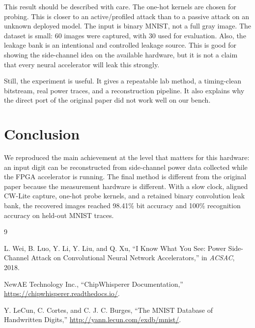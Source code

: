 \documentclass[10pt,conference]{IEEEtran}
\begin{document}
This result should be described with care. The one-hot kernels are chosen for
probing. This is closer to an active/profiled attack than to a passive attack on
an unknown deployed model. The input is binary MNIST, not a full gray image. The
dataset is small: 60 images were captured, with 30 used for evaluation. Also,
the leakage bank is an intentional and controlled leakage source. This is good
for showing the side-channel idea on the available hardware, but it is not a
claim that every neural accelerator will leak this strongly.

Still, the experiment is useful. It gives a repeatable lab method, a timing-clean
bitstream, real power traces, and a reconstruction pipeline. It also explains
why the direct port of the original paper did not work well on our bench.

\section{Conclusion}

We reproduced the main achievement at the level that matters for this hardware:
an input digit can be reconstructed from side-channel power data collected while
the FPGA accelerator is running. The final method is different from the original
paper because the measurement hardware is different. With a slow clock, aligned
CW-Lite capture, one-hot probe kernels, and a retained binary convolution leak
bank, the recovered images reached 98.41\% bit accuracy and 100\% recognition
accuracy on held-out MNIST traces.

\begin{thebibliography}{9}

L. Wei, B. Luo, Y. Li, Y. Liu, and Q. Xu,
``I Know What You See: Power Side-Channel Attack on Convolutional Neural
Network Accelerators,''
in \emph{ACSAC}, 2018.

NewAE Technology Inc.,
``ChipWhisperer Documentation,''
\url{https://chipwhisperer.readthedocs.io/}.

Y. LeCun, C. Cortes, and C. J. C. Burges,
``The MNIST Database of Handwritten Digits,''
\url{http://yann.lecun.com/exdb/mnist/}.

\end{thebibliography}
\end{document}
